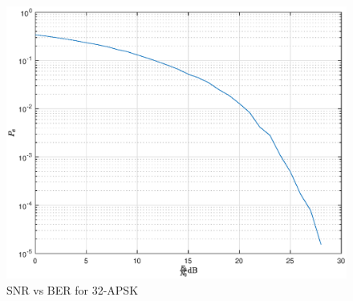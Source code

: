 \documentclass[journal,12pt,twocolumn]{IEEEtran}
\begin{document}
\begin{figure}[!ht]
\begin{center}
\includegraphics[width=\columnwidth]{./figs/apsk32}
\end{center}
\caption{SNR vs BER for 32-APSK}
\label{fig:32apsk1}
\end{figure}


\end{document}

